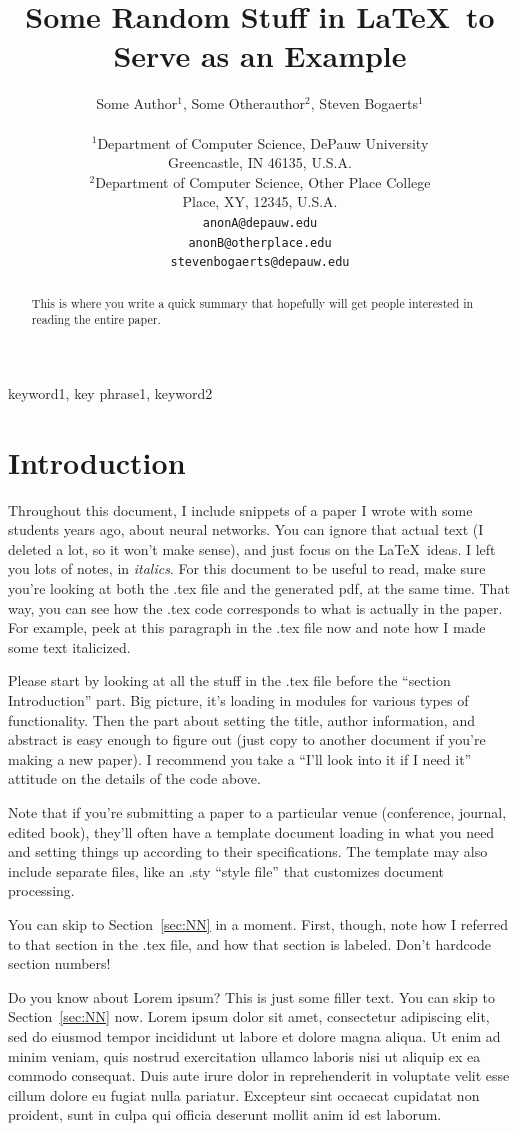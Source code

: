\documentclass[twocolumn,letterpaper,10pt]{article}
\title{Some Random Stuff in \LaTeX~to Serve as an Example}
\author{Some Author$^1$, Some Otherauthor$^2$, Steven Bogaerts$^1$ \\
\\
$^1$Department of Computer Science, DePauw University\\
Greencastle, IN 46135, U.S.A.\\
$^2$Department of Computer Science, Other Place College\\
Place, XY, 12345, U.S.A.\\
{\tt anonA@depauw.edu} \\
{\tt anonB@otherplace.edu} \\
{\tt stevenbogaerts@depauw.edu}
}
\begin{document}
\maketitle

\begin{abstract}

This is where you write a quick summary that hopefully will get people interested in reading the entire paper.

\end{abstract}

 keyword1, key phrase1, keyword2

\section{Introduction}

Throughout this document, I include snippets of a paper I wrote with some students years ago, about neural networks. You can ignore that actual text (I deleted a lot, so it won't make sense), and just focus on the \LaTeX~ideas. I left you lots of notes, in {\it italics}. For this document to be useful to read, make sure you're looking at both the .tex file and the generated pdf, at the same time. That way, you can see how the .tex code corresponds to what is actually in the paper. For example, peek at this paragraph in the .tex file now and note how I made some text italicized.

Please start by looking at all the stuff in the .tex file before the ``section Introduction'' part.  Big picture, it's loading in modules for various types of functionality. Then the part about setting the title, author information, and abstract is easy enough to figure out (just copy to another document if you're making a new paper). I recommend you take a ``I'll look into it if I need it'' attitude on the details of the code above.

Note that if you're submitting a paper to a particular venue (conference, journal, edited book), they'll often have a template document loading in what you need and setting things up according to their specifications. The template may also include separate files, like an .sty ``style file'' that customizes document processing.

You can skip to Section~\ref{sec:NN} in a moment. First, though, note how I referred to that section in the .tex file, and how that section is labeled. Don't hardcode section numbers!

Do you know about Lorem ipsum? This is just some filler text. You can skip to Section~\ref{sec:NN} now. Lorem ipsum dolor sit amet, consectetur adipiscing elit, sed do eiusmod tempor incididunt ut labore et dolore magna aliqua. Ut enim ad minim veniam, quis nostrud exercitation ullamco laboris nisi ut aliquip ex ea commodo consequat. Duis aute irure dolor in reprehenderit in voluptate velit esse cillum dolore eu fugiat nulla pariatur. Excepteur sint occaecat cupidatat non proident, sunt in culpa qui officia deserunt mollit anim id est laborum.
\end{document}
